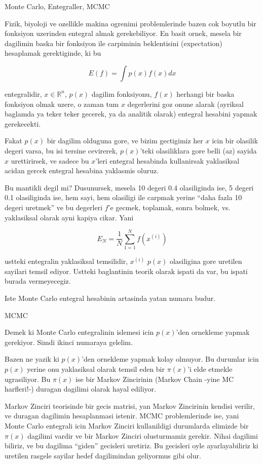 \documentclass[12pt,fleqn]{article}
\begin{document}
Monte Carlo, Entegraller, MCMC

Fizik, biyoloji ve ozellikle makina ogrenimi problemlerinde bazen cok
boyutlu bir fonksiyon uzerinden entegral almak gerekebiliyor. En basit
ornek, mesela bir dagilimin baska bir fonksiyon ile carpiminin beklentisini
(expectation) hesaplamak gerektiginde, ki bu

\[ E(f) = \int p(x)f(x)dx \]

entegralidir, $x \in \mathbb{R}^n$, $p(x)$ dagilim fonksiyonu, $f(x)$ herhangi bir
baska fonksiyon olmak uzere, o zaman tum $x$ degerlerini goz onune alarak
(ayriksal baglamda ya teker teker gecerek, ya da analitik olarak) entegral
hesabini yapmak gerekecekti.

Fakat $p(x)$ bir dagilim olduguna gore, ve bizim gectigimiz her $x$ icin
bir olasilik degeri varsa, bu isi tersine cevirerek, $p(x)$'teki
olasiliklara gore belli (az) sayida $x$ urettirirsek, ve sadece bu $x$'leri
entegral hesabinda kullanirsak yaklasiksal acidan gercek entegral hesabina
yaklasmis oluruz. 

Bu mantikli degil mi? Dusunursek, mesela 10 degeri 0.4 olasiliginda ise, 5
degeri 0.1 olasiliginda ise, hem sayi, hem olasiligi ile carpmak yerine
``daha fazla 10 degeri uretmek'' ve bu degerleri $f$'e gecmek, toplamak,
sonra bolmek, vs. yaklasiksal olarak ayni kapiya cikar. Yani

\[ E_N = \frac{1}{N}\sum_{1=1}^N f(x^{(i)}) \]

ustteki entegralin yaklasiksal temsilidir, $x^{(i)}$ $p(x)$ olasiligina
gore uretilen sayilari temsil ediyor. Ustteki baglantinin teorik olarak
ispati da var, bu ispati burada vermeyecegiz. 

Iste Monte Carlo entegral hesabinin artasinda yatan numara budur. 

MCMC

Demek ki Monte Carlo entegralinin islemesi icin $p(x)$'den ornekleme yapmak
gerekiyor. Simdi ikinci numaraya gelelim. 

Bazen ne yazik ki $p(x)$'den ornekleme yapmak kolay olmuyor. Bu durumlar
icin $p(x)$ yerine onu yaklasiksal olarak temsil eden bir $\pi(x)$'i elde
etmekle ugrasiliyor. Bu $\pi(x)$ ise bir Markov Zincirinin (Markov Chain
-yine MC harfleri!-) duragan dagilimi olarak hayal ediliyor. 

Markov Zinciri teorisinde bir gecis matrisi, yan Markov Zincirinin kendisi
verilir, ve duragan dagilimin hesaplanmasi istenir. MCMC problemlerinde
ise, yani Monte Carlo entegrali icin Markov Zinciri kullanildigi durumlarda
elimizde bir $\pi(x)$ dagilimi vardir ve bir Markov Zinciri olusturmamiz
gerekir. Nihai dagilimi biliriz, ve bu dagilima ``giden'' gecisleri
uretiriz. Bu gecisleri oyle ayarlayabiliriz ki uretilen rasgele sayilar
hedef dagilimindan geliyormus gibi olur. 
\end{document}
